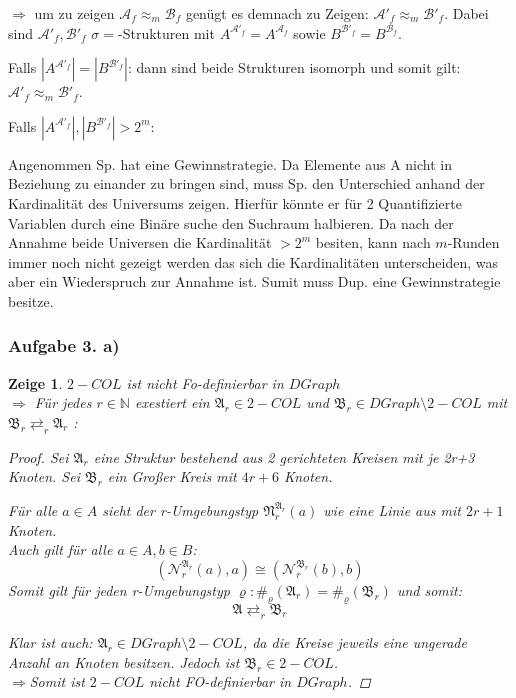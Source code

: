 \documentclass[12pt]{article}
\newtheorem{zeige}{Zeige}
\begin{document}
$\Rightarrow$ um zu zeigen $\mathcal{A}_f \approx_m \mathcal{B}_f$ genügt es demnach zu Zeigen: $\mathcal{A}'_f \approx_m \mathcal{B}'_f$. Dabei sind $\mathcal{A}'_f,\mathcal{B}'_f$ $\sigma={}$-Strukturen mit $A^{ \mathcal{A}'_f } = A^{ \mathcal{A}_f }$ sowie $B^{ \mathcal{B}'_f } = B^{ \mathcal{B}_f }$.

Falls $|A^{ \mathcal{A}'_f }|=|B^{ \mathcal{B}'_f }|$: dann sind beide Strukturen isomorph und somit gilt: $\mathcal{A}'_f \approx_m \mathcal{B}'_f$.

Falls $|A^{ \mathcal{A}'_f }|,|B^{ \mathcal{B}'_f }| > 2^m$: 

Angenommen Sp. hat eine Gewinnstrategie. Da Elemente aus A nicht in Beziehung zu einander zu bringen sind, muss Sp. den Unterschied anhand der Kardinalität des Universums zeigen. Hierfür könnte er für 2 Quantifizierte Variablen durch eine Binäre suche den Suchraum halbieren. Da nach der Annahme beide Universen die Kardinalität $> 2^m$ besiten, kann nach $m$-Runden immer noch nicht gezeigt werden das sich die Kardinalitäten unterscheiden, was aber ein Wiederspruch zur Annahme ist. Sumit muss Dup. eine Gewinnstrategie besitze. 




\subsubsection*{Aufgabe 3. a)}
\begin{zeige}
  $2-COL$ ist nicht Fo-definierbar in $DGraph$\\
  $\Rightarrow$ Für jedes $r\in\mathbb{N}$ exestiert ein $\mathfrak{A}_r \in  2-COL$ und $\mathfrak{B}_r \in DGraph \setminus 2-COL$ mit $\mathfrak{B}_r\rightleftarrows_r \mathfrak{A}_r$ :\\
  
  \begin{proof}
    
    Sei $\mathfrak{A}_r$ eine Struktur bestehend aus 2 gerichteten Kreisen mit je 2r+3 Knoten.
    Sei $\mathfrak{B}_r$ ein Großer Kreis mit $4r+6$ Knoten.

    Für alle $a\in A$ sieht der r-Umgebungstyp $\mathfrak{N}_r^{\mathfrak{A}_r}(a)$ wie eine Linie aus mit $2r+1$ Knoten.\\
    Auch gilt für alle $a\in A, b\in B$: 
    $$(\mathcal{N}_r^{\mathfrak{A}_r}(a),a) \cong (\mathcal{N}_r^{\mathfrak{B}_r}(b),b)$$
    Somit gilt für jeden r-Umgebungstyp $\varrho: \#_\varrho(\mathfrak{A}_r)=\#_\varrho(\mathfrak{B}_r)$ und somit: $$\mathfrak{A}\rightleftarrows_r \mathfrak{B}_r$$
    
    Klar ist auch: $\mathfrak{A}_r\in DGraph\setminus 2-COL$, da die Kreise jeweils eine ungerade Anzahl an Knoten besitzen. Jedoch ist $\mathfrak{B}_r\in 2-COL$.\\
    $\Rightarrow $Somit ist $2-COL$ nicht FO-definierbar in $DGraph$.
  \end{proof}
\end{zeige}
\end{document}
